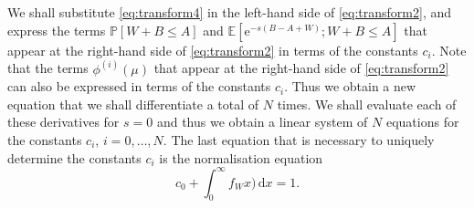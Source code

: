 \documentclass[reqno, 11pt, a4paper]{article}
\theoremstyle{plain}
\theoremstyle{remark}
\numberwithin{equation}{section}
\begin{document}
We shall substitute \eqref{eq:transform4} in the left-hand side of \eqref{eq:transform2}, and express the terms ${\mathbb{P}}[W+B\leqslant A]$ and ${\mathbb{E}}[\mathrm{e}^{-s(B-A+W)};W+B\leqslant A]$ that appear at the right-hand side of \eqref{eq:transform2} in terms of the constants $c_i$. Note that the terms $\phi^{(i)}(\mu)$ that appear at the right-hand side of \eqref{eq:transform2} can also be expressed in terms of the constants $c_i$. Thus we obtain a new equation that we shall differentiate a total of $N$ times. We shall evaluate each of these derivatives for $s=0$ and thus we obtain a linear system of $N$ equations for the constants $c_i$, $i=0,\ldots,N$. The last equation that is necessary to uniquely determine the constants $c_i$ is the normalisation equation
\begin{equation}\label{norma}
c_0+\int_0^\infty {\mbox{$f_W^{}$}}x)\,\mathrm{d}x=1.
\end{equation}
\end{document}
